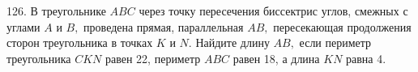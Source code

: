 126. В треугольнике $ABC$ через точку пересечения биссектрис углов, смежных с углами $A$ и $B,$ проведена прямая, параллельная $AB,$ пересекающая продолжения сторон треугольника в точках $K$ и $N.$ Найдите длину $AB,$ если периметр треугольника $CKN$ равен 22, периметр $ABC$ равен 18, а длина $KN$ равна 4.\\
